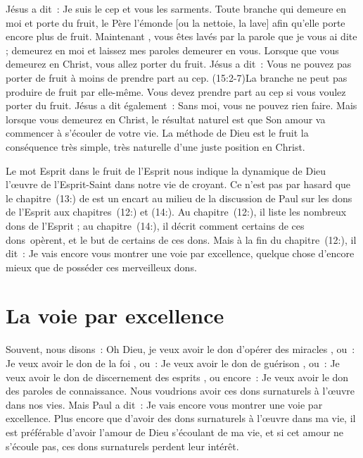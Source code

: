 Jésus a dit~: \Og Je suis le cep et vous les sarments.
 Toute branche qui demeure en moi et porte du fruit,
 le Père l'émonde [ou la nettoie, la lave] afin qu'elle porte
 encore plus de fruit. Maintenant , vous êtes lavés par la parole
 que je vous ai dite ; demeurez en moi et laissez mes paroles
 demeurer en vous. \Fg{}
 Lorsque que vous demeurez en Christ, vous allez porter du fruit.
 Jésus a dit~: \Og Vous ne pouvez pas porter de fruit à moins
 de prendre part au cep. \Fg{} (15:2-7)La branche
 ne peut pas produire de fruit par elle-même.
 Vous devez prendre part au cep si vous voulez porter du fruit.
 Jésus a dit également~: \Og Sans moi, vous ne pouvez rien faire. \Fg{}
 Mais lorsque vous demeurez en Christ, le résultat naturel
 est que Son amour va commencer à s'écouler de votre vie.
 La méthode de Dieu est le fruit \ocadr la conséquence très simple,
 très naturelle d'une juste position en Christ.

Le mot \Og Esprit \Fg{} dans \Og le fruit de l'Esprit \Fg{}
 nous indique la dynamique de Dieu \ocadr l'œuvre de l'Esprit-Saint
 dans notre vie de croyant. Ce n'est pas par hasard que le
 chapitre~(13:) de  est un encart
 au milieu de la discussion de Paul sur les dons de l'Esprit
 aux chapitres~(12:) et (14:).
 Au chapitre~(12:), il liste les nombreux dons de l'Esprit ;
 au chapitre~(14:), il décrit comment certains
 de ces dons~opèrent, et le but de certains de ces dons.
 Mais à la fin du chapitre~(12:), il dit~:
 \Og Je vais encore vous montrer une voie par excellence, \Fg{}
 quelque chose d'encore mieux que de posséder ces merveilleux dons.


\section{La voie par excellence}

Souvent, nous disons~:
 \Og Oh Dieu, je veux avoir le don d'opérer des miracles \Fg{}, ou~:
 \Og Je veux avoir le don de la foi \Fg{}, ou~:
 \Og Je veux avoir le don de guérison \Fg{}, ou~:
 \Og Je veux avoir le don de discernement des esprits \Fg{}, ou encore~:
 \Og Je veux avoir le don des paroles de connaissance. \Fg{}
 Nous voudrions avoir ces dons surnaturels à l'œuvre dans nos vies.
 Mais Paul a dit~:
 \Og Je vais encore vous montrer une voie par excellence. \Fg{}
 Plus encore que d'avoir des dons surnaturels à l'œuvre dans ma vie,
 il est préférable d'avoir l'amour de Dieu s'écoulant de ma vie,
 et si cet amour ne s'écoule pas, ces dons surnaturels perdent leur intérêt.

